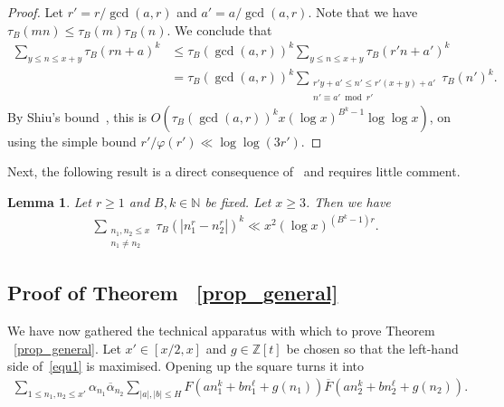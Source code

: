 \documentclass[11pt,letterpaper]{amsart}
\renewcommand{\leq}{\leqslant}
\renewcommand{\geq}{\geqslant}
\newtheorem{lemma}[theorem]{Lemma}
\theoremstyle{definition}
\numberwithin{equation}{section}
\newcommand\NN{\mathbb{N}}
\DeclareMathOperator{\n}{N}
\newcommand{\0}{\mathbf{0}}
\begin{document}
\begin{proof}
Let $r'=r/\gcd(a,r)$ and  $a'=a/\gcd(a,r)$. Note that we have  $\tau_{B}(mn)\leq \tau_B(m)\tau_B(n)$. We conclude that 
\begin{align*}
\sum_{y\leq n\leq x+y}\tau_{B}(rn+a)^k&\leq \tau_B(\gcd(a,r))^k \sum_{y\leq n\leq x+y}\tau_{B}(r'n+a')^k \\
&=\tau_B(\gcd(a,r))^k \sum_{\substack{r'y+a'\leq n'\leq r'(x+y)+a'\\n'\equiv a'\bmod{r'}}}\tau_{B}(n')^k.
\end{align*}
By Shiu's bound~\cite{shiu}, this is
$O(\tau_B(\gcd(a,r))^kx (\log x)^{B^k-1}\log \log x)$,  on 
using the simple bound $r'/\varphi(r')\ll \log \log(3r')$.
\end{proof}

Next, the following result is a direct consequence of~\cite[Thm.~1]{BB} and requires little comment.

\begin{lemma}\label{lem:NT}
Let $r\geq 1$ and $B,k\in \NN$ be fixed. Let $x\geq 3$. Then we have 
\begin{align*}
\sum_{\substack{n_1,n_2\leq x\\n_1\neq n_2}}\tau_B(|n_1^r-n_2^r|)^k\ll x^2(\log x)^{(B^{k}-1)r}.    
\end{align*}
\end{lemma}


\subsection{Proof of Theorem ~\ref{prop_general}}

We  have now gathered  the technical apparatus with which to prove 
Theorem ~\ref{prop_general}.
Let $x'\in [x/2,x]$ and $g\in \mathbb{Z}[t]$ be chosen so that the left-hand side of~\eqref{equ1} is maximised. Opening up the square turns it into 
 \begin{align*}
\sum_{1\leq n_1,n_2\leq x'} \alpha_{n_1}\overline\alpha_{n_2}\sum_{|a|,|b|\leq H}F(an_1^k+bn_1^{\ell}+g(n_1))\overline{F}(an_2^k+bn_2^{\ell}+g(n_2)).   
\end{align*}
\end{document}
